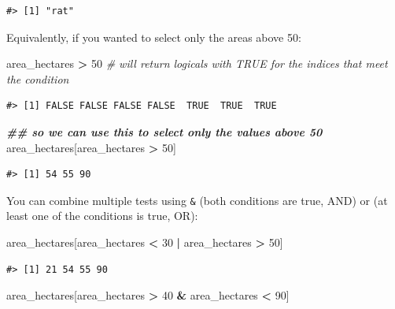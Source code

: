 \documentclass[
]{book}
\newenvironment{Shaded}{\begin{snugshade}}{\end{snugshade}}
\newcommand{\CommentTok}[1]{\textcolor[rgb]{0.56,0.35,0.01}{\textit{#1}}}
\newcommand{\DecValTok}[1]{\textcolor[rgb]{0.00,0.00,0.81}{#1}}
\newcommand{\DocumentationTok}[1]{\textcolor[rgb]{0.56,0.35,0.01}{\textbf{\textit{#1}}}}
\newcommand{\NormalTok}[1]{#1}
\newcommand{\SpecialCharTok}[1]{\textcolor[rgb]{0.81,0.36,0.00}{\textbf{#1}}}
\begin{document}
\begin{verbatim}
#> [1] "rat"
\end{verbatim}

Equivalently, if you wanted to select only the areas above 50:

\begin{Shaded}
\begin{Highlighting}[]
\NormalTok{area\_hectares }\SpecialCharTok{\textgreater{}} \DecValTok{50}    \CommentTok{\# will return logicals with TRUE for the indices that meet the condition}
\end{Highlighting}
\end{Shaded}

\begin{verbatim}
#> [1] FALSE FALSE FALSE FALSE  TRUE  TRUE  TRUE
\end{verbatim}

\begin{Shaded}
\begin{Highlighting}[]
\DocumentationTok{\#\# so we can use this to select only the values above 50}
\NormalTok{area\_hectares[area\_hectares }\SpecialCharTok{\textgreater{}} \DecValTok{50}\NormalTok{]}
\end{Highlighting}
\end{Shaded}

\begin{verbatim}
#> [1] 54 55 90
\end{verbatim}

You can combine multiple tests using \texttt{\&} (both conditions are true, AND) or \texttt{\textbar{}}
(at least one of the conditions is true, OR):

\begin{Shaded}
\begin{Highlighting}[]
\NormalTok{area\_hectares[area\_hectares }\SpecialCharTok{\textless{}} \DecValTok{30} \SpecialCharTok{|}\NormalTok{ area\_hectares }\SpecialCharTok{\textgreater{}} \DecValTok{50}\NormalTok{]}
\end{Highlighting}
\end{Shaded}

\begin{verbatim}
#> [1] 21 54 55 90
\end{verbatim}

\begin{Shaded}
\begin{Highlighting}[]
\NormalTok{area\_hectares[area\_hectares }\SpecialCharTok{\textgreater{}} \DecValTok{40} \SpecialCharTok{\&}\NormalTok{ area\_hectares }\SpecialCharTok{\textless{}} \DecValTok{90}\NormalTok{]}
\end{Highlighting}
\end{Shaded}
\end{document}
